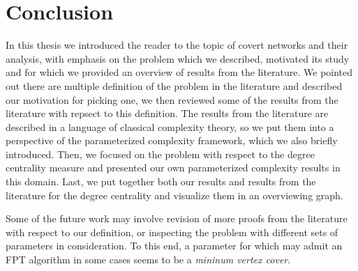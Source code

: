 \chapter{Conclusion}

In this thesis we introduced the reader to the topic of covert networks and their analysis,
with emphasis on the \HL problem which we described, motivated its study
and for which we provided an overview of results from the literature.
We pointed out there are multiple definition of the problem in the literature and described our motivation
for picking one,
we then reviewed some of the results from the literature with repsect to this definition.
The results from the literature are described in a language of classical complexity theory,
so we put them into a perspective of the parameterized complexity framework, which we also briefly introduced.
Then, we focused on the problem with respect to the degree centrality measure
and presented our own parameterized complexity results in this domain.
Last, we put together both our results and results from the literature for the degree centrality
and visualize them in an overviewing graph.

Some of the future work may involve revision of more proofs from the literature with respect to our definition,
or inspecting the problem with different sets of parameters in consideration.
To this end, a parameter for which \HL may admit an FPT algorithm in some cases seems to be a \emph{mininum vertex cover}.
